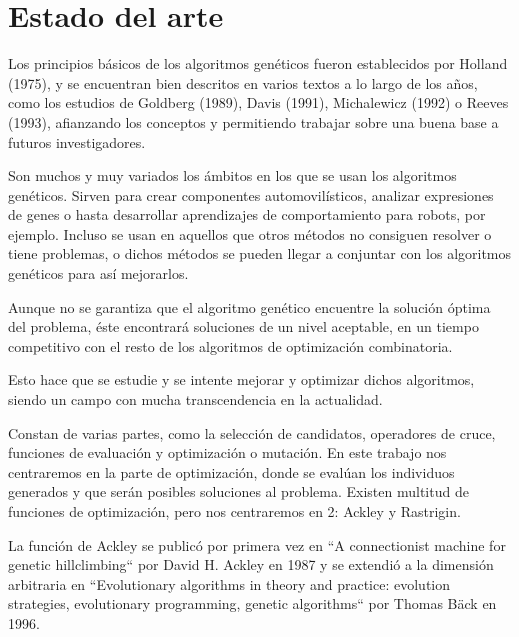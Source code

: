 \chapter{Estado del arte}
\bigskip

Los principios básicos de los algoritmos genéticos fueron establecidos por Holland (1975), y se encuentran bien descritos en varios textos a lo largo de los años, como los estudios de Goldberg (1989), Davis (1991), Michalewicz (1992) o Reeves (1993), afianzando los conceptos y permitiendo trabajar sobre una buena base a futuros investigadores.

\bigskip
Son muchos y muy variados los ámbitos en los que se usan los algoritmos genéticos. Sirven para crear componentes automovilísticos, analizar expresiones de genes o hasta desarrollar aprendizajes de comportamiento para robots, por ejemplo. Incluso se usan en aquellos que otros métodos no consiguen resolver o tiene problemas, o dichos métodos se pueden llegar a conjuntar con los algoritmos genéticos para así mejorarlos.

\bigskip
Aunque no se garantiza que el algoritmo genético encuentre la solución óptima del problema, éste encontrará soluciones de un nivel aceptable, en un tiempo competitivo con el resto de los algoritmos de optimización combinatoria. 

\bigskip
Esto hace que se estudie y se intente mejorar y optimizar dichos algoritmos, siendo un campo con mucha transcendencia en la actualidad.

\bigskip
Constan de varias partes, como la selección de candidatos, operadores de cruce, funciones de evaluación y optimización o mutación. En este trabajo nos centraremos en la parte de optimización, donde se evalúan los individuos generados y que serán posibles soluciones al problema. Existen multitud de funciones de optimización, pero nos centraremos en 2: Ackley y Rastrigin.

\bigskip
La función de Ackley se publicó por primera vez en ``A connectionist machine for genetic hillclimbing`` por David H. Ackley en 1987 y se extendió a la dimensión arbitraria en ``Evolutionary algorithms in theory and practice: evolution strategies, evolutionary programming, genetic algorithms`` por Thomas Bäck en 1996.

